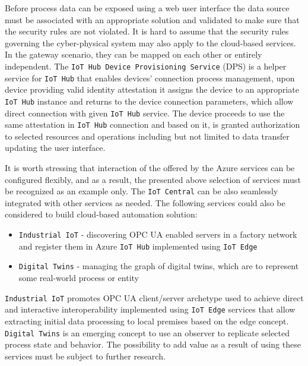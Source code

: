 \documentclass{jacsart}
\providecommand{\tightlist} { \setlength{\itemsep}{0pt}\setlength{\parskip}{0pt}}
\begin{document}
Before process data can be exposed using a web user interface the data
source must be associated with an appropriate solution and validated to
make sure that the security rules are not violated. It is hard to assume
that the security rules governing the cyber-physical system may also
apply to the cloud-based services. In the gateway scenario, they can be
mapped on each other or entirely independent. The
\texttt{IoT\ Hub\ Device\ Provisioning\ Service} (DPS) is a helper
service for \texttt{IoT\ Hub} that enables devices' connection process
management, upon device providing valid identity attestation it assigns
the device to an appropriate \texttt{IoT\ Hub} instance and returns to
the device connection parameters, which allow direct connection with
given \texttt{IoT\ Hub} service. The device proceeds to use the same
attestation in \texttt{IoT\ Hub} connection and based on it, is granted
authorization to selected resources  and operations including but not limited to data transfer updating the user interface.

It is worth stressing that interaction of the offered by the Azure
services can be configured flexibly, and as a result, the presented
above selection of services must be recognized as an example only. The
\texttt{IoT\ Central} can be also seamlessly integrated with other
services as needed. The following services could also be considered to
build cloud-based automation solution:

\begin{itemize}
\tightlist
\item
  \texttt{Industrial\ IoT} - discovering OPC UA enabled servers in a factory network and register them in Azure \texttt{IoT\ Hub} implemented using \texttt{IoT\ Edge}
\item
  \texttt{Digital\ Twins} - managing the graph of digital twins, which are to represent some real-world process or entity
\end{itemize}

\texttt{Industrial\ IoT} promotes OPC UA client/server archetype used to
achieve direct and interactive interoperability implemented using
\texttt{IoT\ Edge} services that allow extracting initial data
processing to local premises based on the edge concept.
\texttt{Digital\ Twins} is an emerging concept to use an observer to
replicate selected process state and behavior. The possibility to add
value as a result of using these services must be subject to further
research.
\end{document}
